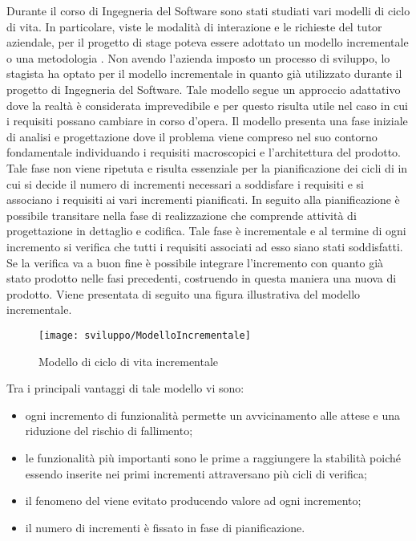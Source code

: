 Durante il corso di Ingegneria del Software sono stati studiati vari modelli di ciclo di vita. In particolare, viste le modalità di interazione e le richieste del tutor aziendale, per il progetto di stage poteva essere adottato un modello incrementale o una metodologia . Non avendo l'azienda imposto un processo di sviluppo, lo stagista ha optato per il modello incrementale in quanto già utilizzato durante il progetto di Ingegneria del Software. Tale modello segue un approccio adattativo dove la realtà è considerata imprevedibile e per questo risulta utile nel caso in cui i requisiti possano cambiare in corso d'opera. Il modello presenta una fase iniziale di analisi e progettazione dove il problema viene compreso nel suo contorno fondamentale individuando i requisiti macroscopici e l'architettura del prodotto. Tale fase non viene ripetuta e risulta essenziale per la pianificazione dei cicli di  in cui si decide il numero di incrementi necessari a soddisfare i requisiti e si associano i requisiti ai vari incrementi pianificati. In seguito alla pianificazione è possibile transitare nella fase di realizzazione che comprende attività di progettazione in dettaglio e codifica. Tale fase è incrementale e al termine di ogni incremento si verifica che tutti i requisiti associati ad esso siano stati soddisfatti. Se la verifica va a buon fine è possibile integrare l'incremento con quanto già stato prodotto nelle fasi precedenti, costruendo in questa maniera una nuova  di prodotto. Viene presentata di seguito una figura illustrativa del modello incrementale.

\begin{figure}[!h] 
    \centering 
    \texttt{[image: sviluppo/ModelloIncrementale]} 
    \caption{Modello di ciclo di vita incrementale}
\end{figure}

Tra i principali vantaggi di tale modello vi sono:
\begin{itemize}
	\item ogni incremento di funzionalità permette un avvicinamento alle attese e una riduzione del rischio di fallimento;
	\item le funzionalità più importanti sono le prime a raggiungere la stabilità poiché essendo inserite nei primi incrementi attraversano più cicli di verifica;
	\item il fenomeno del  viene evitato producendo valore ad ogni incremento;
	\item il numero di incrementi è fissato in fase di pianificazione.
\end{itemize}

